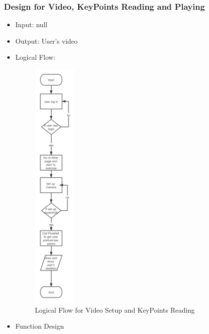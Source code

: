 \documentclass[16pt]{scrreprt}
\begin{document}
\subsubsection{Design for Video, KeyPoints Reading and Playing}
\begin{itemize}
	\item Input: null
	\item Output: User's video
	\item Logical Flow:
	 \begin{figure}[H]
	\centering
	\includegraphics[width=0.2\textwidth]{diagrams/video.png}
	\caption{Logical Flow for Video Setup and KeyPoints Reading}
\end{figure}
	\item Function Design
	\begin{center}
    \begin{tabular}{p{6cm}p{10cm}}
        

\end{tabular}
\end{center}
\end{itemize}
\end{document}
